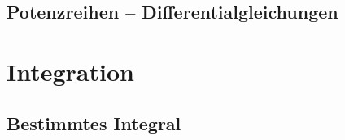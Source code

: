

\subsection{Potenzreihen -- Differentialgleichungen}

\section{Integration}

\subsection{Bestimmtes Integral}
\label{sub:bestInt}
